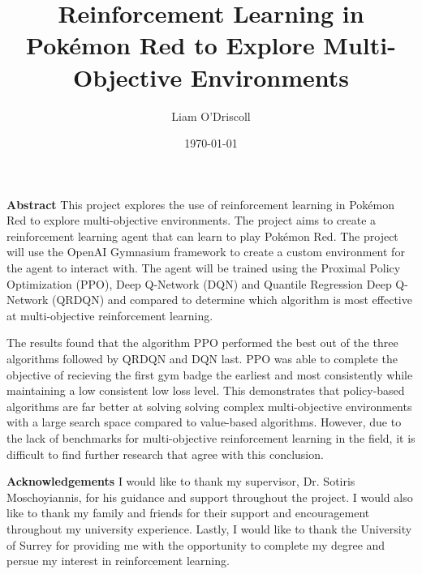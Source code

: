 \documentclass[11pt]{surrey_disso_style}
\title{Reinforcement Learning in Pokémon Red to Explore Multi-Objective Environments}
\author{Liam O'Driscoll}
\date{\today}
\begin{document}
\maketitle


\noindent\LARGE\textbf{Abstract}
\normalsize
\vspace{0.5cm}
\newline
This project explores the use of reinforcement learning in Pokémon Red to explore multi-objective environments. The project aims to create a reinforcement learning agent that can learn to play Pokémon Red. The project will use the OpenAI Gymnasium framework to create a custom environment for the agent to interact with. The agent will be trained using the Proximal Policy Optimization (PPO), Deep Q-Network (DQN) and Quantile Regression Deep Q-Network (QRDQN) and compared to determine which algorithm is most effective at multi-objective reinforcement learning. 

The results found that the algorithm PPO performed the best out of the three algorithms followed by QRDQN and DQN last. PPO was able to complete the objective of recieving the first gym badge the earliest and most consistently while maintaining a low consistent low loss level. This demonstrates that policy-based algorithms are far better at solving solving complex multi-objective environments with a large search space compared to value-based algorithms. However, due to the lack of benchmarks for multi-objective reinforcement learning in the field, it is difficult to find further research that agree with this conclusion.


\noindent\LARGE\textbf{Acknowledgements}
\normalsize
\vspace{0.5cm}
\newline
I would like to thank my supervisor, Dr. Sotiris Moschoyiannis, for his guidance and support throughout the project. I would also like to thank my family and friends for their support and encouragement throughout my university experience. Lastly, I would like to thank the University of Surrey for providing me with the opportunity to complete my degree and persue my interest in reinforcement learning.

\newpage

\tableofcontents











\end{document}
